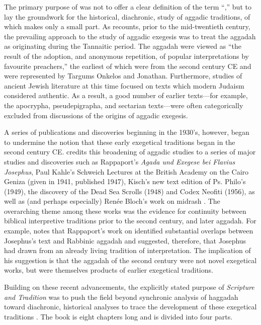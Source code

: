  The primary purpose of  was not to offer a clear definition of the term ``\rwB,'' but to lay the groundwork for the historical, diachronic, study of aggadic traditions, of which \rwB makes only a small part.\autocite[3]{vermes_zsengeller2014} As \vermes recounts, prior to the mid-twentieth century, the prevailing approach to the study of aggadic exegesis was to treat the aggadah as originating during the Tannaitic period. The aggadah were viewed as ``the result of the adoption, and anonymous repetition, of popular interpretations by favourite preachers,'' \autocite[3]{vermes1961} the earliest of which were from the second century CE and were represented by Targums Onkelos and Jonathan. Furthermore, studies of ancient Jewish literature at this time focused on texts which modern Judaism considered authentic. As a result, a good number of earlier texts---for example, the apocrypha, pseudepigrapha, and sectarian texts---were often categorically excluded from discussions of the origins of aggadic exegesis.\autocite[2]{vermes1961} 

 A series of publications and discoveries beginning in the 1930's, however, began to undermine the notion that these early exegetical traditions began in the second century CE. \vermes credits this broadening of aggadic studies to a series of major studies and discoveries such as Rappaport's \emph{Agada und Exegese bei Flavius Josephus},\autocite{rappaport1930} Paul Kahle's Schweich Lectures at the British Academy on the Cairo Geniza (given in 1941, published 1947),\autocite{kahle1947} Kisch's new text edition of Ps. Philo's \lab (1949),\autocite{kisch1949} the discovery of the Dead Sea Scrolls (1948) and Codex Neofiti (1956), as well as (and perhaps especially) Renée Bloch's work on midrash \autocites{bloch1954}{bloch1955_repr}[3--7]{vermes1961}. The overarching theme among these works was the evidence for continuity between biblical interpretive traditions prior to the second century, and later aggadah. For example, \vermes notes that Rappaport's work on \ant identified substantial overlaps between Josephus's text and Rabbinic aggadah and suggested, therefore, that Josephus had drawn from an already living tradition of interpretation. The implication of his suggestion is that the aggadah of the second century were not novel exegetical works, but were themselves products of earlier exegetical traditions. 

 Building on these recent advancements, the explicitly stated purpose of \emph{Scripture and Tradition} was to push the field beyond synchronic analysis of haggadah toward diachronic, historical analyses to trace the development of these exegetical traditions \autocites[1]{vermes1961}[See also][]{bloch1955_repr}. The book is eight chapters long and is divided into four parts. 

